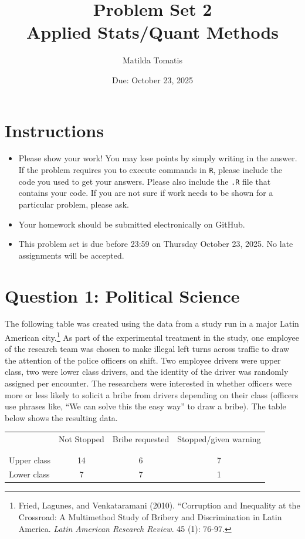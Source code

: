 \documentclass[12pt,letterpaper]{article}
\title{Problem Set 2 \\
	\large Applied Stats/Quant Methods }
\date{Due: October 23, 2025}
\author{Matilda Tomatis}
\begin{document}
	\maketitle
	\section*{Instructions}
\begin{itemize}
	\item Please show your work! You may lose points by simply writing in the answer. If the problem requires you to execute commands in \texttt{R}, please include the code you used to get your answers. Please also include the \texttt{.R} file that contains your code. If you are not sure if work needs to be shown for a particular problem, please ask.
	\item Your homework should be submitted electronically on GitHub.
	\item This problem set is due before 23:59 on Thursday October 23, 2025. No late assignments will be accepted.

\end{itemize}

	
	\vspace{.5cm}
	\section*{Question 1: Political Science}
		\vspace{.25cm}
	The following table was created using the data from a study run in a major Latin American city.\footnote{Fried, Lagunes, and Venkataramani (2010). ``Corruption and Inequality at the Crossroad: A Multimethod Study of Bribery and Discrimination in Latin America. \textit{Latin American Research Review}. 45 (1): 76-97.} As part of the experimental treatment in the study, one employee of the research team was chosen to make illegal left turns across traffic to draw the attention of the police officers on shift. Two employee drivers were upper class, two were lower class drivers, and the identity of the driver was randomly assigned per encounter. The researchers were interested in whether officers were more or less likely to solicit a bribe from drivers depending on their class (officers use phrases like, ``We can solve this the easy way'' to draw a bribe). The table below shows the resulting data.

\newpage
\begin{table}[h!]
	\centering
	\begin{tabular}{l | c c c }
		& Not Stopped & Bribe requested & Stopped/given warning \\
		\\[-1.8ex] 
		\hline \\[-1.8ex]
		Upper class & 14 & 6 & 7 \\
		Lower class & 7 & 7 & 1 \\
		\hline
	\end{tabular}
\end{table}
\end{document}
